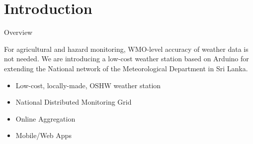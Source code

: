 \documentclass[xcolor=dvipsnames,beamer,unknownkeysallowed]{beamer} %
\begin{document}
\section{Introduction}
\begin{frame}[fragile]{Overview}

For agricultural and hazard monitoring, WMO-level accuracy of weather data is not needed. We are introducing a low-cost weather station based on Arduino for extending the National network of the Meteorological Department in Sri Lanka.
\newline\linebreak

\begin{itemize}
 \item Low-cost, locally-made, OSHW weather station
 \item National Distributed Monitoring Grid
 \item Online Aggregation
 \item Mobile/Web Apps
\end{itemize}
\end{frame}
\end{document}
